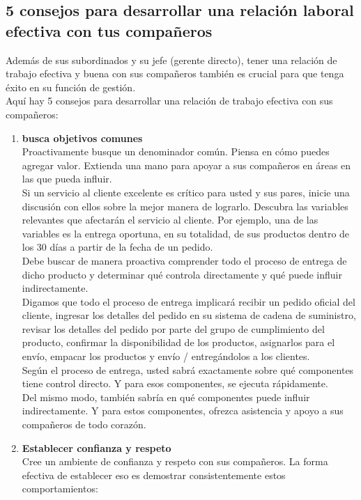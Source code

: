 \documentclass[10pt]{book}
\begin{document}
\subsection{5 consejos para desarrollar una relación laboral efectiva con tus compañeros}
Además de sus subordinados y su jefe (gerente directo), tener una relación de trabajo efectiva y buena con sus compañeros también es crucial para que tenga éxito en su función de gestión.\\
Aquí hay 5 consejos para desarrollar una relación de trabajo efectiva con sus compañeros:
\begin{enumerate}[\bfseries 1.]
\item \textbf{busca objetivos comunes}\\
Proactivamente busque un denominador común. Piensa en cómo puedes agregar valor. Extienda una mano para apoyar a sus compañeros en áreas en las que pueda influir.\\
Si un servicio al cliente excelente es crítico para usted y sus pares, inicie una discusión con ellos sobre la mejor manera de lograrlo. Descubra las variables relevantes que afectarán el servicio al cliente. Por ejemplo, una de las variables es la entrega oportuna, en su totalidad, de sus productos dentro de los 30 días a partir de la fecha de un pedido.\\
Debe buscar de manera proactiva comprender todo el proceso de entrega de dicho producto y determinar qué controla directamente y qué puede influir indirectamente.\\
Digamos que todo el proceso de entrega implicará recibir un pedido oficial del cliente, ingresar los detalles del pedido en su sistema de cadena de suministro, revisar los detalles del pedido por parte del grupo de cumplimiento del producto, confirmar la disponibilidad de los productos, asignarlos para el envío, empacar los productos y envío / entregándolos a los clientes.\\
Según el proceso de entrega, usted sabrá exactamente sobre qué componentes tiene control directo. Y para esos componentes, se ejecuta rápidamente.\\
Del mismo modo, también sabría en qué componentes puede influir indirectamente. Y para estos componentes, ofrezca asistencia y apoyo a sus compañeros de todo corazón.
\item \textbf{Establecer confianza y respeto}\\
Cree un ambiente de confianza y respeto con sus compañeros. La forma efectiva de establecer eso es demostrar consistentemente estos comportamientos:

\end{enumerate}
\end{document}
